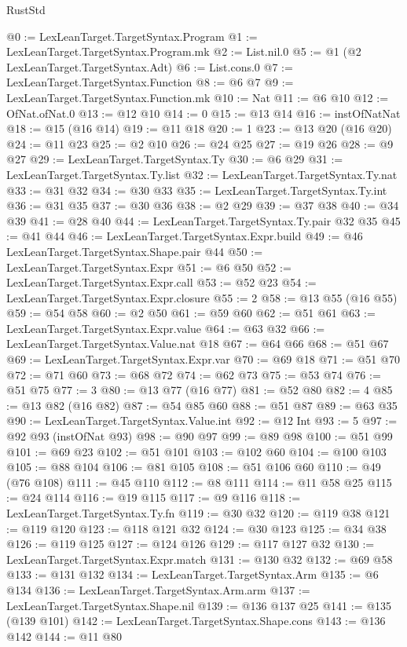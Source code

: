 \begin{lexlean}{RustStd}
\begin{coremodule}
@0 := LexLeanTarget.TargetSyntax.Program
@1 := LexLeanTarget.TargetSyntax.Program.mk
@2 := List.nil.{0}
@5 := @1 (@2 LexLeanTarget.TargetSyntax.Adt)
@6 := List.cons.{0}
@7 := LexLeanTarget.TargetSyntax.Function
@8 := @6 @7
@9 := LexLeanTarget.TargetSyntax.Function.mk
@10 := Nat
@11 := @6 @10
@12 := OfNat.ofNat.{0}
@13 := @12 @10
@14 := 0
@15 := @13 @14
@16 := instOfNatNat
@18 := @15 (@16 @14)
@19 := @11 @18
@20 := 1
@23 := @13 @20 (@16 @20)
@24 := @11 @23
@25 := @2 @10
@26 := @24 @25
@27 := @19 @26
@28 := @9 @27
@29 := LexLeanTarget.TargetSyntax.Ty
@30 := @6 @29
@31 := LexLeanTarget.TargetSyntax.Ty.list
@32 := LexLeanTarget.TargetSyntax.Ty.nat
@33 := @31 @32
@34 := @30 @33
@35 := LexLeanTarget.TargetSyntax.Ty.int
@36 := @31 @35
@37 := @30 @36
@38 := @2 @29
@39 := @37 @38
@40 := @34 @39
@41 := @28 @40
@44 := LexLeanTarget.TargetSyntax.Ty.pair @32 @35
@45 := @41 @44
@46 := LexLeanTarget.TargetSyntax.Expr.build
@49 := @46 LexLeanTarget.TargetSyntax.Shape.pair @44
@50 := LexLeanTarget.TargetSyntax.Expr
@51 := @6 @50
@52 := LexLeanTarget.TargetSyntax.Expr.call
@53 := @52 @23
@54 := LexLeanTarget.TargetSyntax.Expr.closure
@55 := 2
@58 := @13 @55 (@16 @55)
@59 := @54 @58
@60 := @2 @50
@61 := @59 @60
@62 := @51 @61
@63 := LexLeanTarget.TargetSyntax.Expr.value
@64 := @63 @32
@66 := LexLeanTarget.TargetSyntax.Value.nat @18
@67 := @64 @66
@68 := @51 @67
@69 := LexLeanTarget.TargetSyntax.Expr.var
@70 := @69 @18
@71 := @51 @70
@72 := @71 @60
@73 := @68 @72
@74 := @62 @73
@75 := @53 @74
@76 := @51 @75
@77 := 3
@80 := @13 @77 (@16 @77)
@81 := @52 @80
@82 := 4
@85 := @13 @82 (@16 @82)
@87 := @54 @85 @60
@88 := @51 @87
@89 := @63 @35
@90 := LexLeanTarget.TargetSyntax.Value.int
@92 := @12 Int
@93 := 5
@97 := @92 @93 (instOfNat @93)
@98 := @90 @97
@99 := @89 @98
@100 := @51 @99
@101 := @69 @23
@102 := @51 @101
@103 := @102 @60
@104 := @100 @103
@105 := @88 @104
@106 := @81 @105
@108 := @51 @106 @60
@110 := @49 (@76 @108)
@111 := @45 @110
@112 := @8 @111
@114 := @11 @58 @25
@115 := @24 @114
@116 := @19 @115
@117 := @9 @116
@118 := LexLeanTarget.TargetSyntax.Ty.fn
@119 := @30 @32
@120 := @119 @38
@121 := @119 @120
@123 := @118 @121 @32
@124 := @30 @123
@125 := @34 @38
@126 := @119 @125
@127 := @124 @126
@129 := @117 @127 @32
@130 := LexLeanTarget.TargetSyntax.Expr.match
@131 := @130 @32
@132 := @69 @58
@133 := @131 @132
@134 := LexLeanTarget.TargetSyntax.Arm
@135 := @6 @134
@136 := LexLeanTarget.TargetSyntax.Arm.arm
@137 := LexLeanTarget.TargetSyntax.Shape.nil
@139 := @136 @137 @25
@141 := @135 (@139 @101)
@142 := LexLeanTarget.TargetSyntax.Shape.cons
@143 := @136 @142
@144 := @11 @80

\end{coremodule}
\end{lexlean}
